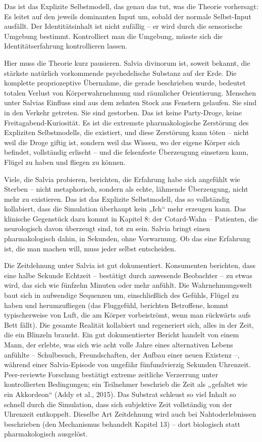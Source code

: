 \documentclass[11pt, twoside, openright]{book}
\begin{document}
Das ist das Explizite Selbstmodell, das genau das tut, was die Theorie vorhersagt: Es leitet auf den jeweils dominanten Input um, sobald der normale Selbst-Input ausfällt. Der Identitätsinhalt ist nicht zufällig -- er wird durch die sensorische Umgebung bestimmt. Kontrolliert man die Umgebung, müsste sich die Identitätserfahrung kontrollieren lassen.

Hier muss die Theorie kurz pausieren. Salvia divinorum ist, soweit bekannt, die stärkste natürlich vorkommende psychedelische Substanz auf der Erde. Die komplette propriozeptive Übernahme, die gerade beschrieben wurde, bedeutet totalen Verlust von Körperwahrnehmung und räumlicher Orientierung. Menschen unter Salvias Einfluss sind aus dem zehnten Stock aus Fenstern gelaufen. Sie sind in den Verkehr getreten. Sie sind gestorben. Das ist keine Party-Droge, keine Freitagabend-Kuriosität. Es ist die extremste pharmakologische Zerstörung des Expliziten Selbstmodells, die existiert, und diese Zerstörung kann töten -- nicht weil die Droge giftig ist, sondern weil das Wissen, wo der eigene Körper sich befindet, vollständig erlischt -- und die felsenfeste Überzeugung einsetzen kann, Flügel zu haben und fliegen zu können.

Viele, die Salvia probieren, berichten, die Erfahrung habe sich angefühlt wie Sterben -- nicht metaphorisch, sondern als echte, lähmende Überzeugung, nicht mehr zu existieren. Das ist das Explizite Selbstmodell, das so vollständig kollabiert, dass die Simulation überhaupt kein „Ich“ mehr erzeugen kann. Das klinische Gegenstück dazu kommt in Kapitel 8: der Cotard-Wahn -- Patienten, die neurologisch davon überzeugt sind, tot zu sein. Salvia bringt einen pharmakologisch dahin, in Sekunden, ohne Vorwarnung. Ob das eine Erfahrung ist, die man machen will, muss jeder selbst entscheiden.

Die Zeitdehnung unter Salvia ist gut dokumentiert. Konsumenten berichten, dass eine halbe Sekunde Echtzeit -- bestätigt durch anwesende Beobachter -- zu etwas wird, das sich wie fünfzehn Minuten oder mehr anfühlt. Die Wahrnehmungswelt baut sich in aufwendige Sequenzen um, einschließlich des Gefühls, Flügel zu haben und herumzufliegen (das Fluggefühl, berichten Betroffene, kommt typischerweise von Luft, die am Körper vorbeiströmt, wenn man rückwärts aufs Bett fällt). Die gesamte Realität kollabiert und regeneriert sich, alles in der Zeit, die ein Blinzeln braucht. Ein gut dokumentierter Bericht handelt von einem Mann, der erlebte, was sich wie acht volle Jahre eines alternativen Lebens anfühlte -- Schulbesuch, Freundschaften, der Aufbau einer neuen Existenz --, während einer Salvia-Episode von ungefähr fünfundvierzig Sekunden Uhrenzeit. Peer-reviewte Forschung bestätigt extreme zeitliche Verzerrung unter kontrollierten Bedingungen; ein Teilnehmer beschrieb die Zeit als „gefaltet wie ein Akkordeon“ (Addy et al., 2015). Das Substrat schleust so viel Inhalt so schnell durch die Simulation, dass sich subjektive Zeit vollständig von der Uhrenzeit entkoppelt. Dieselbe Art Zeitdehnung wird auch bei Nahtoderlebnissen beschrieben (den Mechanismus behandelt Kapitel 13) -- dort biologisch statt pharmakologisch ausgelöst.
\end{document}
